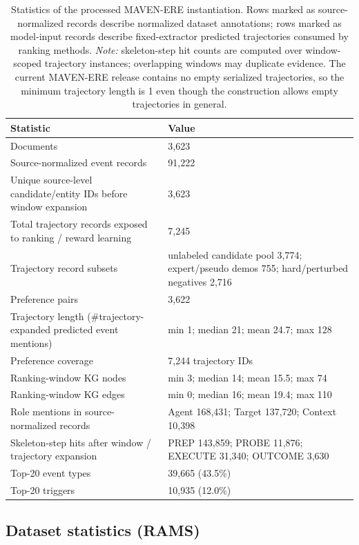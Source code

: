 \documentclass{article}
\begin{document}
\begin{table}[t]
\centering
\caption{Statistics of the processed MAVEN-ERE instantiation.
Rows marked as source-normalized records describe normalized dataset annotations; rows marked as model-input records describe fixed-extractor predicted trajectories consumed by ranking methods.
\textit{Note:} skeleton-step hit counts are computed over window-scoped trajectory instances; overlapping windows may duplicate evidence.
The current MAVEN-ERE release contains no empty serialized trajectories, so the minimum trajectory length is 1 even though the construction allows empty trajectories in general.}
\label{tab:mavenere_stats}
\begin{tabularx}{\linewidth}{YY}
\hline
Statistic & Value \\
\hline
Documents & 3,623 \\
Source-normalized event records & 91,222 \\
Unique source-level candidate/entity IDs before window expansion & 3,623 \\
Total trajectory records exposed to ranking / reward learning & 7,245 \\
Trajectory record subsets & unlabeled candidate pool 3,774; expert/pseudo demos 755; hard/perturbed negatives 2,716 \\
Preference pairs & 3,622 \\
Trajectory length (\#trajectory-expanded predicted event mentions) & min 1; median 21; mean 24.7; max 128 \\
Preference coverage & 7,244 trajectory IDs \\
Ranking-window KG nodes & min 3; median 14; mean 15.5; max 74 \\
Ranking-window KG edges & min 0; median 16; mean 19.4; max 110 \\
Role mentions in source-normalized records & Agent 168,431; Target 137,720; Context 10,398 \\
Skeleton-step hits after window / trajectory expansion & PREP 143,859; PROBE 11,876; EXECUTE 31,340; OUTCOME 3,630 \\
Top-20 event types & 39,665 (43.5\%) \\
Top-20 triggers & 10,935 (12.0\%) \\
\hline
\end{tabularx}
\end{table}

\subsection{Dataset statistics (RAMS)}
\label{sec:app_rams_stats}
\end{document}
